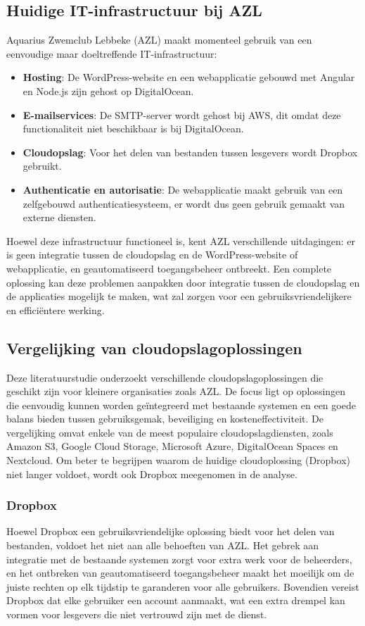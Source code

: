 \subsection{Huidige IT-infrastructuur bij AZL}
Aquarius Zwemclub Lebbeke (AZL) maakt momenteel gebruik van een eenvoudige maar doeltreffende IT-infrastructuur:
\begin{itemize}
    \item \textbf{Hosting}: De WordPress-website en een webapplicatie gebouwd met Angular en Node.js zijn gehost op DigitalOcean.
    \item \textbf{E-mailservices}: De SMTP-server wordt gehost bij AWS, dit omdat deze functionaliteit niet beschikbaar is bij DigitalOcean.
    \item \textbf{Cloudopslag}: Voor het delen van bestanden tussen lesgevers wordt Dropbox gebruikt.
    \item \textbf{Authenticatie en autorisatie}: De webapplicatie maakt gebruik van een zelfgebouwd authenticatiesysteem, er wordt dus geen gebruik gemaakt van externe diensten.
\end{itemize}
Hoewel deze infrastructuur functioneel is, kent AZL verschillende uitdagingen: er is geen integratie tussen de cloudopslag en de 
WordPress-website of webapplicatie, en geautomatiseerd toegangsbeheer ontbreekt. Een complete oplossing kan deze problemen aanpakken 
door integratie tussen de cloudopslag en de applicaties mogelijk te maken, wat zal zorgen voor een gebruiksvriendelijkere en efficiëntere werking.

\subsection{Vergelijking van cloudopslagoplossingen}
Deze literatuurstudie onderzoekt verschillende cloudopslagoplossingen die geschikt zijn voor kleinere organisaties zoals AZL. 
De focus ligt op oplossingen die eenvoudig kunnen worden geïntegreerd met bestaande systemen en een goede balans bieden tussen gebruiksgemak, 
beveiliging en kosteneffectiviteit. De vergelijking omvat enkele van de meest populaire cloudopslagdiensten, zoals Amazon S3, Google Cloud Storage, 
Microsoft Azure, DigitalOcean Spaces en Nextcloud. Om beter te begrijpen waarom de huidige cloudoplossing (Dropbox) niet langer voldoet, wordt ook 
Dropbox meegenomen in de analyse.

\subsubsection{Dropbox}
Hoewel Dropbox een gebruiksvriendelijke oplossing biedt voor het delen van bestanden, voldoet het niet aan alle behoeften van AZL. 
Het gebrek aan integratie met de bestaande systemen zorgt voor extra werk voor de beheerders, en het ontbreken van geautomatiseerd 
toegangsbeheer maakt het moeilijk om de juiste rechten op elk tijdstip te garanderen voor alle gebruikers. Bovendien vereist Dropbox dat 
elke gebruiker een account aanmaakt, wat een extra drempel kan vormen voor lesgevers die niet vertrouwd zijn met de dienst.

